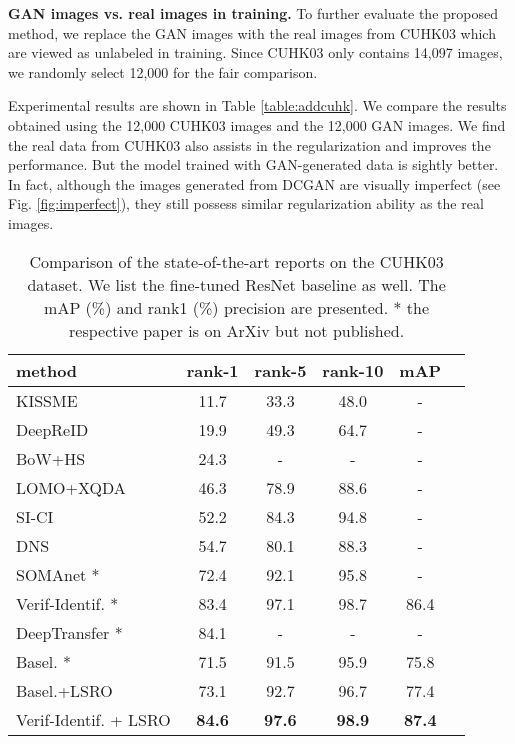 \documentclass[10pt,twocolumn,letterpaper]{article}
\begin{document}
\textbf{GAN images vs. real images in training.} To further evaluate the proposed method, we replace the GAN images with the real images from CUHK03 which are viewed as unlabeled in training. Since CUHK03 only contains 14,097 images, we randomly select 12,000 for the fair comparison. 

Experimental results are shown in Table \ref{table:addcuhk}. We compare the results obtained using the 12,000 CUHK03 images and the 12,000 GAN images. We find the real data from CUHK03 also assists in the regularization and improves the performance. But the model trained with GAN-generated data is sightly better. In fact, although the images generated from DCGAN are visually imperfect (see Fig. \ref{fig:imperfect}), they still possess similar regularization ability as the real images.

\setlength{\tabcolsep}{4pt}
\begin{table}
\begin{center}
\begin{tabular}{l|ccccc}
\hline
method & rank-1 & rank-5 & rank-10 & mAP\\
\hline
KISSME \cite{kostinger2012large} & 11.7 & 33.3 & 48.0 & -\\
DeepReID \cite{li2014deepreid} & 19.9 & 49.3 & 64.7 & -\\ 
BoW+HS \cite{zheng2015scalable} & 24.3 & - & - & -\\
LOMO+XQDA \cite{liao2015person} & 46.3 & 78.9 & 88.6 &-\\
SI-CI \cite{wang2016joint} & 52.2 & 84.3 & 94.8 &-\\
DNS \cite{zhang2016learning} & 54.7 & 80.1 & 88.3 &-\\
SOMAnet \cite{barbosa2017looking}* &72.4& 92.1 & 95.8 & - \\
Verif-Identif. \cite{zheng2016discriminatively}* & 83.4 & 97.1 & 98.7 & 86.4\\
DeepTransfer \cite{geng2016deep}* & 84.1& - & - & - \\
\hline
Basel. \cite{zheng2016survey,zheng2016discriminatively}* & 71.5 & 91.5 & 95.9 & 75.8\\ 
Basel.+LSRO & 73.1 & 92.7 & 96.7 & 77.4 \\
Verif-Identif. + LSRO & \textbf{84.6} & \textbf{97.6} & \textbf{98.9} & \textbf{87.4}\\
\hline
\end{tabular}
\end{center}
\caption{Comparison of the state-of-the-art reports on the CUHK03 dataset. We list the fine-tuned ResNet baseline as well. The mAP (\%) and rank1 (\%) precision are presented. * the respective paper is on ArXiv but not published.}
\label{table:CUHK03}
\end{table}
\end{document}

